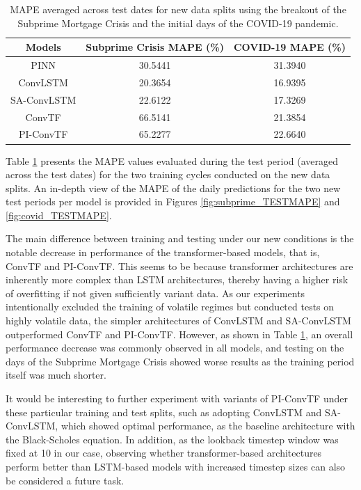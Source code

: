 \documentclass{article}
\begin{document}
\begin{table}[htp]
    \centering
    \begin{tabular}{|c c c|}
         \hline
         Models & Subprime Crisis MAPE (\%) & COVID-19 MAPE (\%) \\ 
         \hline\hline
         PINN & 30.5441 & 31.3940 \\
         \hline
         ConvLSTM & 20.3654 & 16.9395 \\
         \hline
         SA-ConvLSTM & 22.6122 & 17.3269 \\
         \hline
         ConvTF & 66.5141 & 21.3854 \\
         \hline
         PI-ConvTF & 65.2277 & 22.6640 \\
         \hline 
    \end{tabular}
    \captionsetup{skip=10pt}
    \caption{MAPE averaged across test dates for new data splits using the breakout of the Subprime Mortgage Crisis and the initial days of the COVID-19 pandemic.}
    \label{table:4}
\end{table}

Table \ref{table:4} presents the MAPE values evaluated during the test period (averaged across the test dates) for the two training cycles conducted on the new data splits. An in-depth view of the MAPE of the daily predictions for the two new test periods per model is provided in Figures \ref{fig:subprime_TESTMAPE} and \ref{fig:covid_TESTMAPE}.

The main difference between training and testing under our new conditions is the notable decrease in performance of the transformer-based models, that is, ConvTF and PI-ConvTF. This seems to be because transformer architectures are inherently more complex than LSTM architectures, thereby having a higher risk of overfitting if not given sufficiently variant data. As our experiments intentionally excluded the training of volatile regimes but conducted tests on highly volatile data, the simpler architectures of ConvLSTM and SA-ConvLSTM outperformed ConvTF and PI-ConvTF. However, as shown in Table \ref{table:4}, an overall performance decrease was commonly observed in all models, and testing on the days of the Subprime Mortgage Crisis showed worse results as the training period itself was much shorter. 

It would be interesting to further experiment with variants of PI-ConvTF under these particular training and test splits, such as adopting ConvLSTM and SA-ConvLSTM, which showed optimal performance, as the baseline architecture with the Black-Scholes equation. In addition, as the lookback timestep window was fixed at 10 in our case, observing whether transformer-based architectures perform better than LSTM-based models with increased timestep sizes can also be considered a future task.
\end{document}
